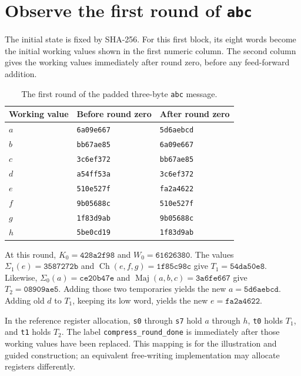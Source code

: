 \section{Observe the first round of \texttt{abc}}
The initial state is fixed by SHA-256. For this first block, its eight words become the
initial working values shown in the first numeric column. The second column gives the
working values immediately after round zero, before any feed-forward addition.

\begin{table}[htbp]
  \centering\caption{The first round of the padded three-byte \texttt{abc} message.}
  \begin{tabular}{lll}
    \toprule
    Working value & Before round zero & After round zero  \\
    \midrule
    \(a\)         & \texttt{6a09e667} & \texttt{5d6aebcd} \\
    \(b\)         & \texttt{bb67ae85} & \texttt{6a09e667} \\
    \(c\)         & \texttt{3c6ef372} & \texttt{bb67ae85} \\
    \(d\)         & \texttt{a54ff53a} & \texttt{3c6ef372} \\
    \(e\)         & \texttt{510e527f} & \texttt{fa2a4622} \\
    \(f\)         & \texttt{9b05688c} & \texttt{510e527f} \\
    \(g\)         & \texttt{1f83d9ab} & \texttt{9b05688c} \\
    \(h\)         & \texttt{5be0cd19} & \texttt{1f83d9ab} \\
    \bottomrule
  \end{tabular}
\end{table}

At this round, \(K_0=\mathtt{428a2f98}\) and \(W_0=\mathtt{61626380}\).
The values \(\Sigma_1(e)=\mathtt{3587272b}\) and
\(\operatorname{Ch}(e,f,g)=\mathtt{1f85c98c}\) give
\(T_1=\mathtt{54da50e8}\). Likewise,
\(\Sigma_0(a)=\mathtt{ce20b47e}\) and
\(\operatorname{Maj}(a,b,c)=\mathtt{3a6fe667}\) give
\(T_2=\mathtt{08909ae5}\). Adding those two temporaries yields the new
\(a=\mathtt{5d6aebcd}\). Adding old \(d\) to \(T_1\), keeping its low word,
yields the new \(e=\mathtt{fa2a4622}\).

In the reference register allocation, \texttt{s0} through \texttt{s7} hold
\(a\) through \(h\), \texttt{t0} holds \(T_1\), and \texttt{t1} holds \(T_2\).
The label \texttt{compress\_round\_done} is immediately after those working values
have been replaced. This mapping is for the illustration and guided construction;
an equivalent free-writing implementation may allocate registers differently.

